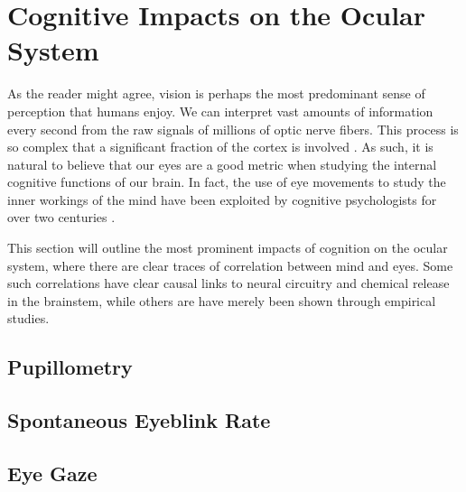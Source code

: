\section{Cognitive Impacts on the Ocular System} \label{sec:bt/cognitive_impacts}

As the reader might agree, vision is perhaps the most predominant sense of perception that humans enjoy. We can interpret vast amounts of information every second from the raw signals of millions of optic nerve fibers. This process is so complex that a significant fraction of the cortex is involved \cite{klatzky2012}. As such, it is natural to believe that our eyes are a good metric when studying the internal cognitive functions of our brain. In fact, the use of eye movements to study the inner workings of the mind have been exploited by cognitive psychologists for over two centuries \cite{wells1792}. 

This section will outline the most prominent impacts of cognition on the ocular system, where there are clear traces of correlation between mind and eyes. Some such correlations have clear causal links to neural circuitry and chemical release in the brainstem, while others are have merely been shown through empirical studies. 



\subsection{Pupillometry}
\subsection{Spontaneous Eyeblink Rate}
\subsection{Eye Gaze}
